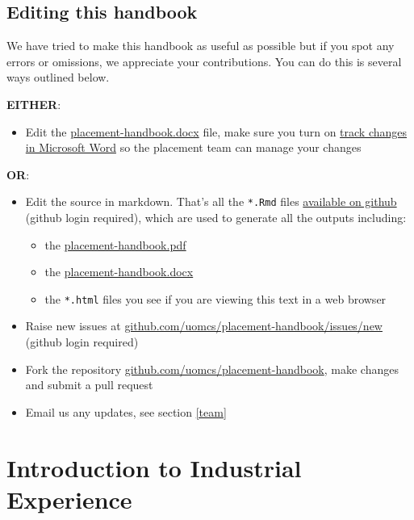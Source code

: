 \documentclass[
]{book}
\providecommand{\tightlist}{%
  \setlength{\itemsep}{0pt}\setlength{\parskip}{0pt}}
\begin{document}
\section{Editing this handbook}\label{edit}

We have tried to make this handbook as useful as possible but if you spot any errors or omissions, we appreciate your contributions. You can do this is several ways outlined below.

\textbf{EITHER}:

\begin{itemize}
\tightlist
\item
  Edit the \url{placement-handbook.docx} file, make sure you turn on \href{https://support.microsoft.com/en-gb/office/track-changes-in-word-197ba630-0f5f-4a8e-9a77-3712475e806a}{track changes in Microsoft Word} so the placement team can manage your changes
\end{itemize}

\textbf{OR}:

\begin{itemize}
\tightlist
\item
  Edit the source in markdown. That's all the \texttt{*.Rmd} files \href{https://github.com/search?q=repo\%3AUoMCS\%2Fplacement-handbook++language\%3ARMarkdown&type=code}{available on github} (github login required), which are used to generate all the outputs including:

  \begin{itemize}
  \tightlist
  \item
    the \url{placement-handbook.pdf}
  \item
    the \url{placement-handbook.docx}
  \item
    the \texttt{*.html} files you see if you are viewing this text in a web browser
  \end{itemize}
\item
  Raise new issues at \href{https://github.com/uomcs/placement-handbook/issues/new}{github.com/uomcs/placement-handbook/issues/new} (github login required)
\item
  Fork the repository \href{https://github.com/uomcs/placement-handbook}{github.com/uomcs/placement-handbook}, make changes and submit a pull request
\item
  Email us any updates, see section \ref{team}
\end{itemize}

\chapter{Introduction to Industrial Experience}\label{intro}
\end{document}
